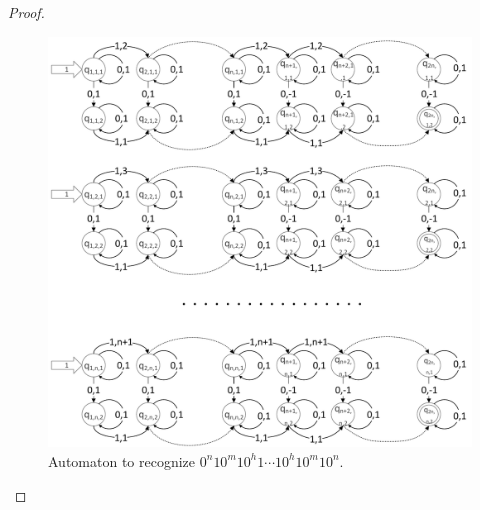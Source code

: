 \documentclass{llncs}
\begin{document}
\begin{definicija}
\begin{proof}
\begin{figure}[h!]
\centering
\includegraphics[width=\textwidth]{Img/1pfa.pdf}
\caption{Automaton to recognize $0^n10^m10^h1 \cdots 10^h10^m10^n$.}
\label{fig:1pfa}
\end{figure}


\end{proof}
\end{definicija}
\end{document}
